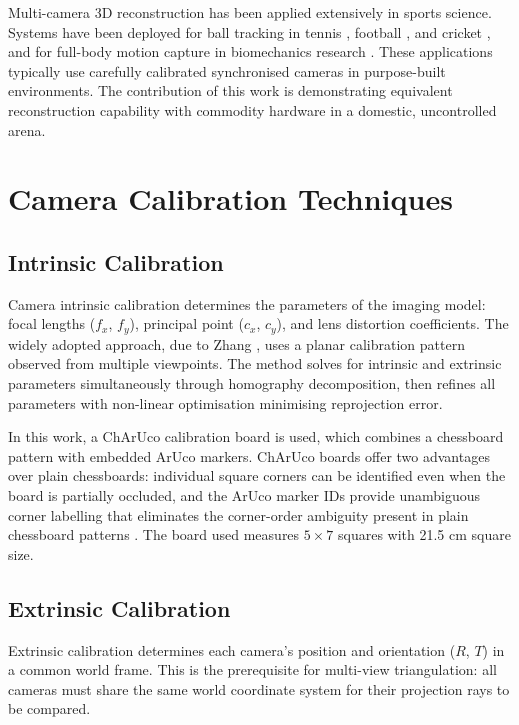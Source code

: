Multi-camera 3D reconstruction has been applied extensively in sports science. Systems have been deployed for ball tracking in tennis \cite{ref5}, football \cite{ref6}, and cricket \cite{ref7}, and for full-body motion capture in biomechanics research \cite{ref8}. These applications typically use carefully calibrated synchronised cameras in purpose-built environments. The contribution of this work is demonstrating equivalent reconstruction capability with commodity hardware in a domestic, uncontrolled arena.

\section{Camera Calibration Techniques}

\subsection{Intrinsic Calibration}

Camera intrinsic calibration determines the parameters of the imaging model: focal lengths ($f_x$, $f_y$), principal point ($c_x$, $c_y$), and lens distortion coefficients. The widely adopted approach, due to Zhang \cite{ref9}, uses a planar calibration pattern observed from multiple viewpoints. The method solves for intrinsic and extrinsic parameters simultaneously through homography decomposition, then refines all parameters with non-linear optimisation minimising reprojection error.

In this work, a ChArUco calibration board is used, which combines a chessboard pattern with embedded ArUco markers. ChArUco boards offer two advantages over plain chessboards: individual square corners can be identified even when the board is partially occluded, and the ArUco marker IDs provide unambiguous corner labelling that eliminates the corner-order ambiguity present in plain chessboard patterns \cite{ref10}. The board used measures $5 \times 7$ squares with 21.5 cm square size.

\subsection{Extrinsic Calibration}

Extrinsic calibration determines each camera's position and orientation ($R$, $T$) in a common world frame. This is the prerequisite for multi-view triangulation: all cameras must share the same world coordinate system for their projection rays to be compared.

